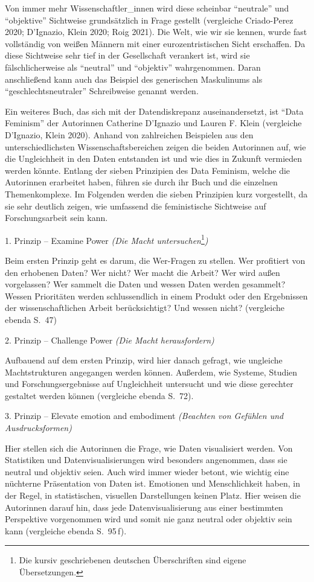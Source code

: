 \documentclass[a4paper,
fontsize=11pt,
oneside,
numbers=noperiodatend,
parskip=half-,
bibliography=totoc,
final
]{scrartcl}
\begin{document}
Von immer mehr Wissenschaftler\_innen wird diese scheinbar
\enquote{neutrale} und \enquote{objektive} Sichtweise grundsätzlich in
Frage gestellt (vergleiche Criado-Perez 2020; D'Ignazio, Klein 2020; Roig
2021). Die Welt, wie wir sie kennen, wurde fast vollständig von weißen
Männern mit einer eurozentristischen Sicht erschaffen. Da diese
Sichtweise sehr tief in der Gesellschaft verankert ist, wird sie
fälschlicherweise als \enquote{neutral} und \enquote{objektiv}
wahrgenommen. Daran anschließend kann auch das Beispiel des generischen
Maskulinums als \enquote{geschlechtsneutraler} Schreibweise genannt
werden.

Ein weiteres Buch, das sich mit der Datendiskrepanz auseinandersetzt,
ist \enquote{Data Feminism} der Autorinnen Catherine D'Ignazio und
Lauren F. Klein (vergleiche D'Ignazio, Klein 2020). Anhand von zahlreichen
Beispielen aus den unterschiedlichsten Wissenschaftsbereichen zeigen die
beiden Autorinnen auf, wie die Ungleichheit in den Daten entstanden ist
und wie dies in Zukunft vermieden werden könnte. Entlang der sieben
Prinzipien des Data Feminism, welche die Autorinnen erarbeitet haben,
führen sie durch ihr Buch und die einzelnen Themenkomplexe. Im Folgenden
werden die sieben Prinzipien kurz vorgestellt, da sie sehr deutlich
zeigen, wie umfassend die feministische Sichtweise auf Forschungsarbeit
sein kann.

1. Prinzip -- Examine Power \emph{(Die Macht
untersuchen}\footnote{Die kursiv geschriebenen deutschen Überschriften
  sind eigene Übersetzungen.}\emph{)}

Beim ersten Prinzip geht es darum, die Wer-Fragen zu stellen. Wer
profitiert von den erhobenen Daten? Wer nicht? Wer macht die Arbeit? Wer
wird außen vorgelassen? Wer sammelt die Daten und wessen Daten werden
gesammelt? Wessen Prioritäten werden schlussendlich in einem Produkt
oder den Ergebnissen der wissenschaftlichen Arbeit berücksichtigt? Und
wessen nicht? (vergleiche ebenda S.~47)

2. Prinzip -- Challenge Power \emph{(Die Macht herausfordern)}

Aufbauend auf dem ersten Prinzip, wird hier danach gefragt, wie
ungleiche Machtstrukturen angegangen werden können. Außerdem, wie
Systeme, Studien und Forschungsergebnisse auf Ungleichheit untersucht
und wie diese gerechter gestaltet werden können (vergleiche ebenda S.~72).

3. Prinzip -- Elevate emotion and embodiment \emph{(Beachten von
Gefühlen und Ausdrucksformen)}

Hier stellen sich die Autorinnen die Frage, wie Daten visualisiert
werden. Von Statistiken und Datenvisualisierungen wird besonders
angenommen, dass sie neutral und objektiv seien. Auch wird immer wieder
betont, wie wichtig eine nüchterne Präsentation von Daten ist. Emotionen
und Menschlichkeit haben, in der Regel, in statistischen, visuellen
Darstellungen keinen Platz. Hier weisen die Autorinnen darauf hin, dass
jede Datenvisualisierung aus einer bestimmten Perspektive vorgenommen
wird und somit nie ganz neutral oder objektiv sein kann (vergleiche ebenda S.~95\,f).
\end{document}
